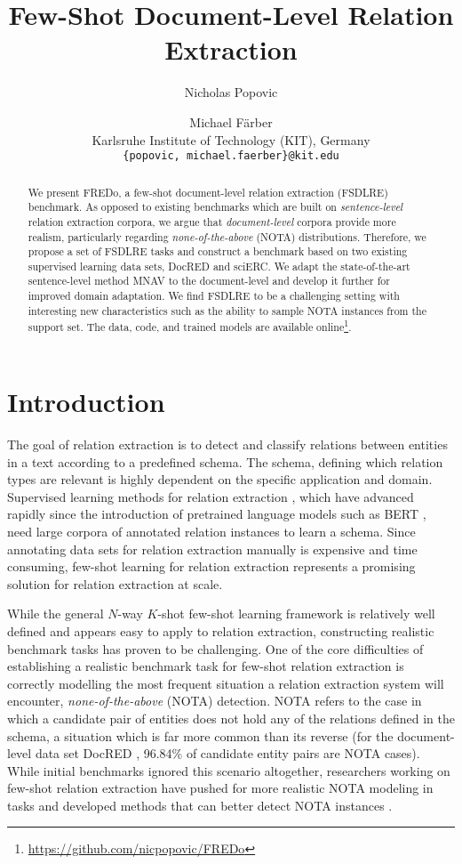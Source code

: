 \documentclass[11pt]{article}
\title{Few-Shot Document-Level Relation Extraction}
\author{Nicholas Popovic \and Michael Färber\\
  Karlsruhe Institute of Technology (KIT), Germany \\
  \texttt{\{popovic, michael.faerber\}@kit.edu} \\}
\begin{document}
\maketitle
\begin{abstract}
We present FREDo, a few-shot document-level relation extraction (FSDLRE) benchmark.
As opposed to existing benchmarks which are built on \textit{sentence-level} relation extraction corpora, we argue that \textit{document-level} corpora provide more realism, particularly regarding \textit{none-of-the-above} (NOTA) distributions.
Therefore, we propose a set of FSDLRE tasks and construct a benchmark based on two existing supervised learning data sets, DocRED and sciERC.
We adapt the state-of-the-art sentence-level method MNAV to the document-level and develop it further for improved domain adaptation.
We find FSDLRE to be a challenging setting with interesting new characteristics such as the ability to sample NOTA instances from the support set.
The data, code, and trained models are available online\footnote{\url{https://github.com/nicpopovic/FREDo}}.

\end{abstract}


\section{Introduction}

The goal of relation extraction is to detect and classify relations between entities in a text according to a predefined schema.
The schema, defining which relation types are relevant is highly dependent on the specific application and domain.
Supervised learning methods for relation extraction \cite{soares_matching_2019,zhou_document-level_2020,zhang_document-level_2021,xu_entity_2021,xiao_sais_2021}, which have advanced rapidly since the introduction of pretrained language models such as BERT \cite{devlin_bert_2019}, need large corpora of annotated relation instances to learn a schema.
Since annotating data sets for relation extraction manually is expensive and time consuming, few-shot learning for relation extraction represents a promising solution for relation extraction at scale. 

While the general $N$-way $K$-shot few-shot learning framework is relatively well defined and appears easy to apply to relation extraction, constructing realistic benchmark tasks has proven to be challenging. 
One of the core difficulties of establishing a realistic benchmark task for few-shot relation extraction is correctly modelling the most frequent situation a relation extraction system will encounter, \textit{none-of-the-above} (NOTA) detection.
NOTA refers to the case in which a candidate pair of entities does not hold any of the relations defined in the schema, a situation which is far more common than its reverse (for the document-level data set DocRED \cite{yao_docred_2019}, 96.84\% of candidate entity pairs are NOTA cases).
While initial benchmarks \cite{han_fewrel_2018} ignored this scenario altogether, researchers working on few-shot relation extraction have pushed for more realistic NOTA modeling in tasks and developed methods that can better detect NOTA instances \cite{gao_fewrel_2019,sabo_revisiting_2021}.
\end{document}
